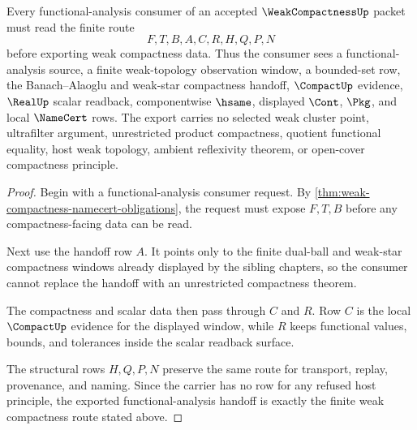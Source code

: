 \begin{theorem}
\label{thm:weak-compactness-functional-analysis-handoff}
Every functional-analysis consumer of an accepted $\WeakCompactnessUp$ packet must read the finite route
$$
F,T,B,A,C,R,H,Q,P,N
$$
before exporting weak compactness data. Thus the consumer sees a functional-analysis source, a finite weak-topology observation window, a bounded-set row, the Banach--Alaoglu and weak-star compactness handoff, $\CompactUp$ evidence, $\RealUp$ scalar readback, componentwise $\hsame$, displayed $\Cont$, $\Pkg$, and local $\NameCert$ rows. The export carries no selected weak cluster point, ultrafilter argument, unrestricted product compactness, quotient functional equality, host weak topology, ambient reflexivity theorem, or open-cover compactness principle.
\end{theorem}
\begin{proof}
Begin with a functional-analysis consumer request. By \autoref{thm:weak-compactness-namecert-obligations}, the request must expose $F,T,B$ before any compactness-facing data can be read.

Next use the handoff row $A$. It points only to the finite dual-ball and weak-star compactness windows already displayed by the sibling chapters, so the consumer cannot replace the handoff with an unrestricted compactness theorem.

The compactness and scalar data then pass through $C$ and $R$. Row $C$ is the local $\CompactUp$ evidence for the displayed window, while $R$ keeps functional values, bounds, and tolerances inside the scalar readback surface.

The structural rows $H,Q,P,N$ preserve the same route for transport, replay, provenance, and naming. Since the carrier has no row for any refused host principle, the exported functional-analysis handoff is exactly the finite weak compactness route stated above.
\end{proof}


